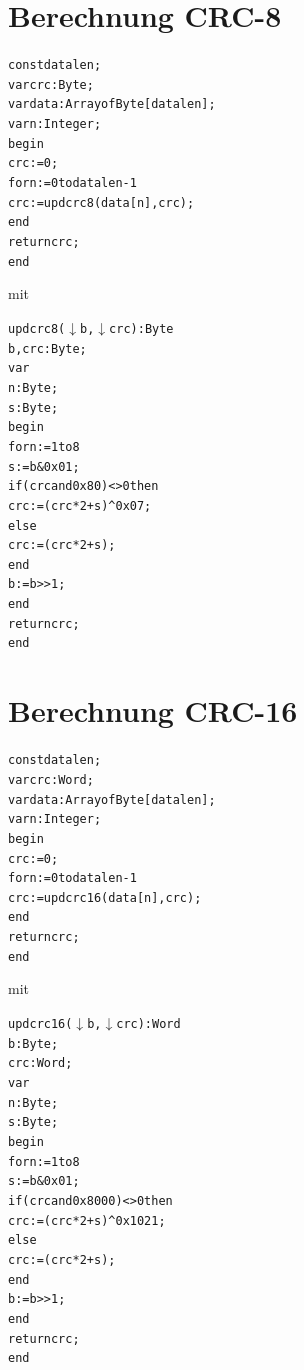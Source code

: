 \documentclass[10pt,a4paper]{article}
\begin{document}
\newpage
\appendix
\section{Berechnung CRC-8}
\label{CRC8}
\begin{alltt}
const datalen;
var crc: Byte;
var data: Array of Byte[datalen];
var n: Integer;
begin
  crc:= 0;
  for n:=0 to datalen-1
    crc := updcrc8(data[n],crc); 
  end
  return crc;
end
\end{alltt}
mit
\begin{alltt}
updcrc8(\(\downarrow\) b,\(\downarrow\) crc): Byte
  b, crc : Byte;
var
  n : Byte;
  s : Byte;
begin
  for n:=1 to 8
    s := b & 0x01;
    if (crc and 0x80)<> 0 then
      crc := (crc * 2 + s) ^ 0x07;
    else
      crc := (crc * 2 + s);
    end
    b := b >> 1;
  end
  return crc;
end
\end{alltt}

\section{Berechnung CRC-16}
\label{CRC16}
\begin{alltt}
const datalen;
var crc: Word;
var data: Array of Byte[datalen];
var n: Integer;
begin
  crc:= 0;
  for n:=0 to datalen-1
    crc := updcrc16(data[n],crc); 
  end
  return crc;
end
\end{alltt}
mit
\begin{alltt}
updcrc16(\(\downarrow\) b,\(\downarrow\) crc): Word
  b : Byte;
  crc: Word;
var
  n : Byte;
  s : Byte;
begin
  for n:=1 to 8
    s := b & 0x01;
    if (crc and 0x8000)<> 0 then
      crc := (crc * 2 + s) ^ 0x1021;
    else
      crc := (crc * 2 + s);
    end
    b := b >> 1;
  end
  return crc;
end
\end{alltt}
\end{document}
